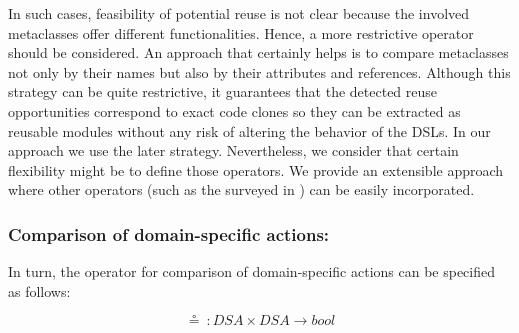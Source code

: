 In such cases, feasibility of potential reuse is not clear because the involved metaclasses offer different functionalities. Hence, a more restrictive operator should be considered. An approach that certainly helps is to compare metaclasses not only by their names but also by their attributes and references. Although this strategy can be quite restrictive, it guarantees that the detected reuse opportunities correspond to exact code clones so they can be extracted as reusable modules without any risk of altering the behavior of the DSLs. In our approach we use the later strategy. Nevertheless, we consider that certain flexibility might be to define those operators. We provide an extensible approach where other operators (such as the surveyed in \cite{Lafi:2011}) can be easily incorporated.



\vspace{-3mm}
\subsubsection{Comparison of domain-specific actions:} In turn, the operator for comparison of domain-specific actions can be specified as follows:

\begin{equation}
  \circeq~: DSA \times DSA \rightarrow bool
\end{equation}

